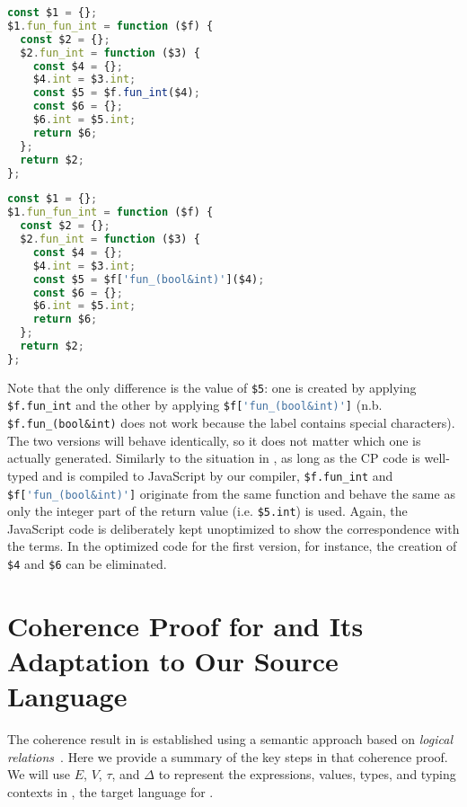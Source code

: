 \noindent
\begin{minipage}{.5\textwidth}
\begin{lstlisting}[language=TypeScript]
const $1 = {};
$1.fun_fun_int = function ($f) {
  const $2 = {};
  $2.fun_int = function ($3) {
    const $4 = {};
    $4.int = $3.int;
    const $5 = $f.fun_int($4);
    const $6 = {};
    $6.int = $5.int;
    return $6;
  };
  return $2;
};
\end{lstlisting}
\end{minipage}%
\begin{minipage}{.5\textwidth}
\begin{lstlisting}[language=TypeScript]
const $1 = {};
$1.fun_fun_int = function ($f) {
  const $2 = {};
  $2.fun_int = function ($3) {
    const $4 = {};
    $4.int = $3.int;
    const $5 = $f['fun_(bool&int)']($4);
    const $6 = {};
    $6.int = $5.int;
    return $6;
  };
  return $2;
};
\end{lstlisting}
\end{minipage}

\noindent
Note that the only difference is the value of \lstinline{$5}: one is created by
applying \lstinline{$f.fun_int} and the other by applying
\lstinline[language=TypeScript]{$f['fun_(bool&int)']}
(n.b. \lstinline{$f.fun_(bool&int)} does not work because the label contains
special characters). The two versions will behave identically, so it does not
matter which one is actually generated. Similarly to the situation in \lambdar,
as long as the CP code is well-typed and is compiled to JavaScript by our
compiler, \lstinline{$f.fun_int} and
\lstinline[language=TypeScript]{$f['fun_(bool&int)']} originate from the same
function and behave the same as only the integer part of the return value  (i.e.
\lstinline{$5.int}) is used. Again, the JavaScript code is deliberately kept
unoptimized to show the correspondence with the \lambdar terms. In the optimized
code for the first version, for instance, the creation of \lstinline{$4} and
\lstinline{$6} can be eliminated.

\section{Coherence Proof for \necolus and Its Adaptation to Our Source Language}
\label{sec:coherence}

The coherence result in \necolus is established using a semantic approach based
on \emph{logical relations}~\citep{tait1967intensional,biernacki2015logical}.
Here we provide a summary of the key steps in that coherence proof. We will use
$E$, $V$, $\tau$, and $\Delta$ to represent the expressions, values, types, and
typing contexts in \lambdac, the target language for \necolus.

